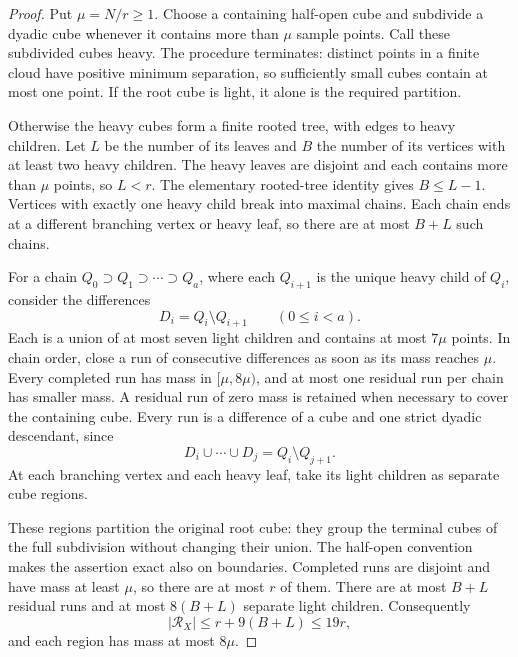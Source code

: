 \begin{proof}
Put $\mu=N/r\ge1$.  Choose a containing half-open cube and subdivide a dyadic cube whenever it contains more than $\mu$ sample points.  Call these subdivided cubes heavy.  The procedure terminates: distinct points in a finite cloud have positive minimum separation, so sufficiently small cubes contain at most one point. If the root cube is light, it alone is the required partition.

Otherwise the heavy cubes form a finite rooted tree, with edges to heavy children.  Let $L$ be the number of its leaves and $B$ the number of its vertices with at least two heavy children. The heavy leaves are disjoint and each contains more than $\mu$ points, so $L<r$.  The elementary rooted-tree identity gives $B\le L-1$.  Vertices with exactly one heavy child break into maximal chains.  Each chain ends at a different branching vertex or heavy leaf, so there are at most $B+L$ such chains.

For a chain $Q_0\supset Q_1\supset\cdots\supset Q_a$, where each $Q_{i+1}$ is the unique heavy child of $Q_i$, consider the differences
\[
 D_i=Q_i\setminus Q_{i+1}\qquad(0\le i<a).
\]
Each is a union of at most seven light children and contains at most $7\mu$ points.  In chain order, close a run of consecutive differences as soon as its mass reaches $\mu$.  Every completed run has mass in $[\mu,8\mu)$, and at most one residual run per chain has smaller mass.  A residual run of zero mass is retained when necessary to cover the containing cube.  Every run is a difference of a cube and one strict dyadic descendant, since
\[
 D_i\cup\cdots\cup D_j=Q_i\setminus Q_{j+1}.
\]
At each branching vertex and each heavy leaf, take its light children as separate cube regions.

These regions partition the original root cube: they group the terminal cubes of the full subdivision without changing their union.  The half-open convention makes the assertion exact also on boundaries.  Completed runs are disjoint and have mass at least $\mu$, so there are at most $r$ of them.  There are at most $B+L$ residual runs and at most $8(B+L)$ separate light children.  Consequently
\[
 |\mathcal{R}_X|\le r+9(B+L)\le19r,
\]
and each region has mass at most $8\mu$.


\end{proof}
